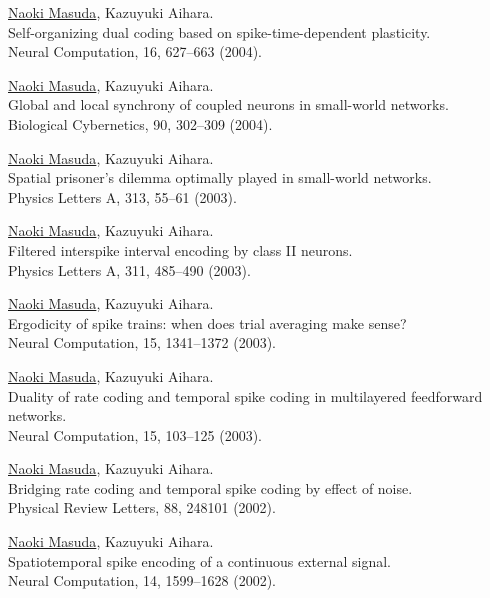 \documentclass[11pt,letter]{article}
\begin{document}
\begin{etaremune}
\item \underline{Naoki Masuda}, Kazuyuki Aihara.\\
Self-organizing dual coding based on spike-time-dependent plasticity.\\
Neural Computation, 16, 627--663 (2004).

\item \underline{Naoki Masuda}, Kazuyuki Aihara.\\
Global and local synchrony of coupled neurons in small-world networks.\\
Biological Cybernetics, 90, 302--309 (2004).

\item \underline{Naoki Masuda}, Kazuyuki Aihara.\\
Spatial prisoner's dilemma optimally played in small-world networks.\\
Physics Letters A, 313, 55--61 (2003).

\item \underline{Naoki Masuda}, Kazuyuki Aihara.\\
Filtered interspike interval encoding by class II neurons.\\
Physics Letters A, 311, 485--490 (2003).

\item \underline{Naoki Masuda}, Kazuyuki Aihara.\\
Ergodicity of spike trains: when does trial averaging make sense?\\
Neural Computation, 15, 1341--1372 (2003).

\item \underline{Naoki Masuda}, Kazuyuki Aihara.\\
Duality of rate coding and temporal spike coding in multilayered feedforward networks.\\
Neural Computation, 15, 103--125 (2003).

\item \underline{Naoki Masuda}, Kazuyuki Aihara.\\
Bridging rate coding and temporal spike coding by effect of noise.\\
Physical Review Letters, 88, 248101 (2002).

\item \underline{Naoki Masuda}, Kazuyuki Aihara.\\
Spatiotemporal spike encoding of a continuous external signal.\\
Neural Computation, 14, 1599--1628 (2002).


\end{etaremune}
\end{document}

